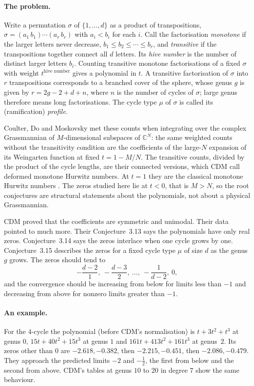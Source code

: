 \documentclass[11pt,a4paper]{article}
\theoremstyle{definition}\newtheorem{definition}[theorem]{Definition}
\theoremstyle{remark}\newtheorem{remark}[theorem]{Remark}\newtheorem{example}[theorem]{Example}
\numberwithin{equation}{section}
\begin{document}
\paragraph{The problem.}
Write a permutation $\sigma$ of $\{1,\dots,d\}$ as a product of transpositions, $\sigma=(a_1\,b_1)\cdots(a_r\,b_r)$ with $a_i<b_i$ for each $i$. Call the factorisation \emph{monotone} if the larger letters never decrease, $b_1\le b_2\le\cdots\le b_r$, and \emph{transitive} if the transpositions together connect all $d$ letters. Its \emph{hive number} is the number of distinct larger letters $b_i$. Counting transitive monotone factorisations of a fixed $\sigma$ with weight $t^{\text{hive number}}$ gives a polynomial in $t$. A transitive factorisation of $\sigma$ into $r$ transpositions corresponds to a branched cover of the sphere, whose genus $g$ is given by $r=2g-2+d+n$, where $n$ is the number of cycles of $\sigma$; large genus therefore means long factorisations. The cycle type $\mu$ of $\sigma$ is called its (ramification) \emph{profile}.

Coulter, Do and Moskovsky \cite{cdm} met these counts when integrating over the complex Grassmannian of $M$-dimensional subspaces of $\mathbb C^N$: the same weighted counts without the transitivity condition are the coefficients of the large-$N$ expansion of its Weingarten function at fixed $t=1-M/N$. The transitive counts, divided by the product of the cycle lengths, are their connected versions, which CDM call deformed monotone Hurwitz numbers. At $t=1$ they are the classical monotone Hurwitz numbers \cite{cdm}. The zeros studied here lie at $t<0$, that is $M>N$, so the root conjectures are structural statements about the polynomials, not about a physical Grassmannian.

CDM proved that the coefficients are symmetric and unimodal. Their data pointed to much more. Their Conjecture~3.13 says the polynomials have only real zeros. Conjecture~3.14 says the zeros interlace when one cycle grows by one. Conjecture~3.15 describes the zeros for a fixed cycle type $\mu$ of size $d$ as the genus $g$ grows. The zeros should tend to
\[
 -\frac{d-2}{1},\ -\frac{d-3}{2},\ \dots,\ -\frac{1}{d-2},\ 0,
\]
and the convergence should be increasing from below for limits less than $-1$ and decreasing from above for nonzero limits greater than $-1$.

\paragraph{An example.}
For the $4$-cycle the polynomial (before CDM's normalisation) is $t+3t^2+t^3$ at genus $0$, $15t+40t^2+15t^3$ at genus $1$ and $161t+413t^2+161t^3$ at genus~$2$. Its zeros other than $0$ are $-2.618,-0.382$, then $-2.215,-0.451$, then $-2.086,-0.479$. They approach the predicted limits $-2$ and $-\tfrac12$, the first from below and the second from above. CDM's tables at genus $10$ to $20$ in degree $7$ show the same behaviour.
\end{document}
